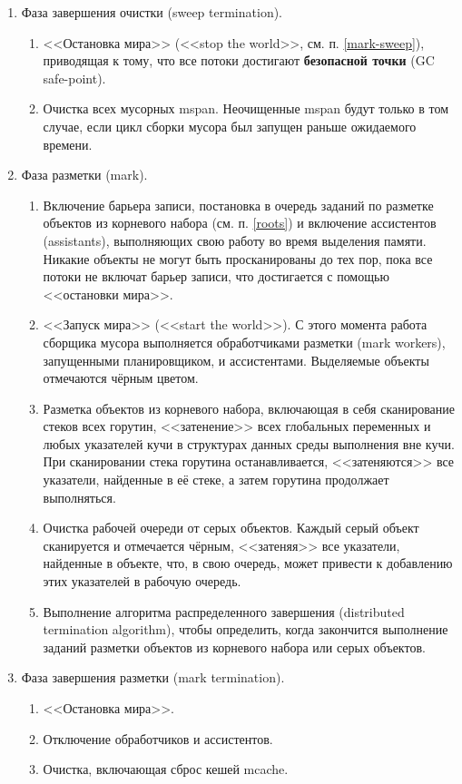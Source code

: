 \begin{enumerate}[label*=\arabic*.]
	\item Фаза завершения очистки (sweep termination).
	\begin{enumerate}[label*=\arabic*.]
		\item <<Остановка мира>> (<<stop the world>>, см. п. \ref{mark-sweep}), приводящая к тому, что все потоки достигают \textbf{безопасной точки} (GC safe-point).
		\item Очистка всех мусорных mspan. Неочищенные mspan будут только в том случае, если цикл сборки мусора был запущен раньше ожидаемого времени.
	\end{enumerate}

	\item Фаза разметки (mark).
	\begin{enumerate}[label*=\arabic*.]
		\item Включение барьера записи, постановка в очередь заданий по разметке объектов из корневого набора (см. п. \ref{roots}) и включение ассистентов (assistants), выполняющих свою работу во время выделения памяти. Никакие объекты не могут быть просканированы до тех пор, пока все потоки не включат барьер записи, что достигается с помощью <<остановки мира>>.
		\item <<Запуск мира>> (<<start the world>>). С этого момента работа сборщика мусора выполняется обработчиками разметки (mark workers), запущенными планировщиком, и ассистентами. Выделяемые объекты отмечаются чёрным цветом.
		\item Разметка объектов из корневого набора, включающая в себя сканирование стеков всех горутин, <<затенение>> всех глобальных переменных и любых указателей кучи в структурах данных среды выполнения вне кучи. При сканировании стека горутина останавливается, <<затеняются>> все указатели, найденные в её стеке, а затем горутина продолжает выполняться.
		\item Очистка рабочей очереди от серых объектов. Каждый серый объект сканируется и отмечается чёрным, <<затеняя>> все указатели, найденные в объекте, что, в свою очередь, может привести к добавлению этих указателей в рабочую очередь.
		\item Выполнение алгоритма распределенного завершения (distributed termination algorithm), чтобы определить, когда закончится выполнение заданий разметки объектов из корневого набора или серых объектов.
	\end{enumerate}

	\item Фаза завершения разметки (mark termination).
	\begin{enumerate}[label*=\arabic*.]
		\item <<Остановка мира>>.
		\item Отключение обработчиков и ассистентов.
		\item Очистка, включающая сброс кешей mcache.
	\end{enumerate}


\end{enumerate}
